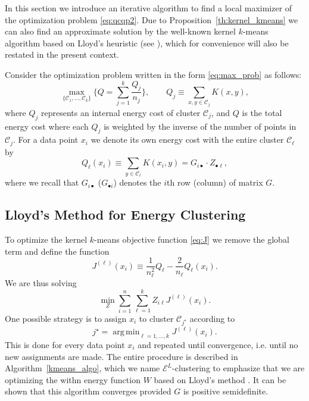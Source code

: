\documentclass[aps,preprint,nofootinbib,floatfix]{revtex4-1}
\DeclareMathOperator*{\argmin}{arg\,min}
\newcommand\kk{K}
\newcommand\C{{\mathcal{C}}}
\begin{document}
In this section we introduce an iterative algorithm to find a local
maximizer of the optimization problem \eqref{eq:qcqp2}. Due to 
Proposition~\ref{th:kernel_kmeans} we can also find an approximate
solution by the well-known kernel $k$-means algorithm based
on Lloyd's heuristic (see \cite{Dhillon2,Dhillon}), which 
for convenience will also be restated in the present context.

Consider the optimization problem 
written in the form \eqref{eq:max_prob} as follows:
\begin{equation}
\label{eq:maxQ}
\max_{\{ \C_1,\dotsc,\C_k \}} 
\bigg\{ Q = \sum_{j=1}^k \dfrac{Q_j}{n_j}  \bigg\},
\qquad Q_j \equiv \sum_{x,y\in\C_j} \kk(x,y),
\end{equation}
where $Q_j$ represents an internal energy cost of cluster $\C_j$, and
$Q$ is the total energy cost where each $Q_j$ 
is weighted by the inverse
of the number of points in $\C_j$. For a data point $x_i$ we denote
its own energy cost
with the entire cluster $\C_\ell$ by
\begin{equation}
\label{eq:costxij}
Q_\ell(x_i) \equiv \sum_{y\in\C_\ell} \kk(x_i, y) = 
G_{i \bullet} \cdot Z_{\bullet \ell},
\end{equation}
where we recall that $G_{i\bullet}$ ($G_{\bullet i}$) denotes
the $i$th row (column) of matrix $G$.


\subsection*{Lloyd's Method for Energy Clustering}

To optimize the kernel $k$-means objective function
\eqref{eq:J} we remove the global term and define the function
\begin{equation}
\label{eq:Jell}
J^{(\ell)}(x_i) \equiv 
\dfrac{1}{n_\ell^2} Q_\ell
-\dfrac{2}{n_\ell} Q_\ell(x_i) .
\end{equation}
We are thus solving 
\begin{equation}
\min_{Z} 
\sum_{i=1}^n 
\sum_{\ell=1}^k Z_{i\ell} J^{(\ell)}(x_i).
\end{equation}
One possible strategy is to
assign  $x_i$ to cluster $\C_{j^\star}$ according
to 
\begin{equation}
j^\star = \argmin_{\ell=1,\dotsc,k} J^{(\ell)}(x_i) .
\end{equation}
This is done for every data point $x_i$ and repeated until
convergence, i.e. until no new assignments are made.
The entire procedure is described in Algorithm~\ref{kmeans_algo}, which
we name $\mathcal{E}^L$-clustering to emphasize
that we are optimizing the withn energy function $W$ 
based on Lloyd's method \cite{Lloyd}.
It can be shown that this algorithm converges provided $G$ is positive
semidefinite. 
\end{document}
